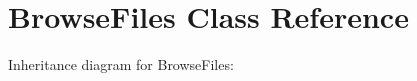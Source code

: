\hypertarget{classBrowseFiles}{}\section{Browse\+Files Class Reference}
\label{classBrowseFiles}


Inheritance diagram for Browse\+Files\+:
